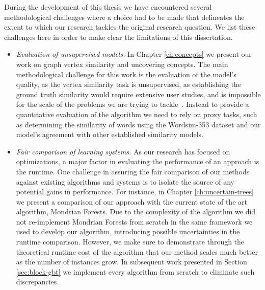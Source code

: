 During the development of this thesis we have encountered several methodological
challenges where a choice had to be made that delineates the extent to which
our research tackles the original research question. We list these challenges
here in order to make clear the limitations of this dissertation.

\begin{itemize}
	\item \emph{Evaluation of unsupervised models.} In Chapter \ref{ch:concepts} we present our
	work on graph vertex similarity and uncovering concepts. The main methodological
	challenge for this work is the evaluation of the model's quality, as the vertex
	similarity task is unsupervised, as establishing the ground truth similarity would
	require extensive user studies, and is impossible for the scale of the problems
	we are trying to tackle~\cite{simrank}. Instead to provide a quantitative evaluation
	of the algorithm we need to rely on proxy tasks, such as determining the similarity
	of words using the Wordsim-353 dataset \cite{wordsim} and our model's agreement
	with other established similarity models.

	\item \emph{Fair comparison of learning systems.} As our research has focused on optimizations,
	a major factor in evaluating the performance of an approach is the runtime. One challenge
	in assuring the fair comparison of our methods against existing algorithms and systems is to isolate
	the source of any potential gains in performance. For instance, in Chapter
	\ref{ch:uncertain-trees} we present a comparison of our approach with the current
	state of the art algorithm, Mondrian Forests. Due to the complexity of the algorithm
	we did not re-implement Mondrian Forests from scratch in the same framework we used to develop our
	algorithm, introducing possible uncertainties in the runtime comparison.
	However, we make sure to demonstrate through the theoretical runtime cost of the
	algorithm that our method scales much better as the number of instances grow.
	In subsequent work presented in Section \ref{sec:block-gbt} we implement every
	algorithm from scratch to eliminate such discrepancies.


\end{itemize}
